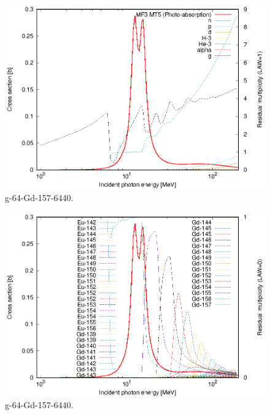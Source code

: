 \begin{figure}
 \includegraphics[width=\linewidth]{eps/g_64-Gd-157_6440.eps}
  \caption{g-64-Gd-157-6440.}
\end{figure}
\begin{figure}
 \includegraphics[width=\linewidth]{eps-law0/g_64-Gd-157_6440.eps}
 \caption{g-64-Gd-157-6440.}
\end{figure}
\newpage \clearpage

